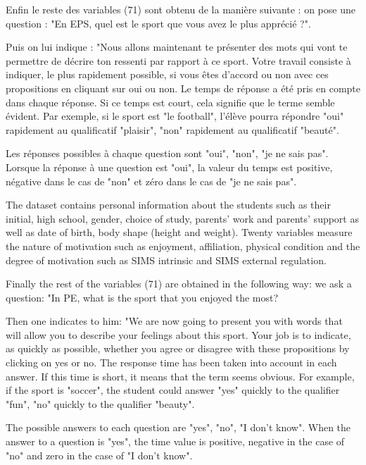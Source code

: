 \documentclass[12pt]{article}
\begin{document}
Enfin le reste des  variables (71)  sont obtenu de la manière suivante :
on pose une question : "En EPS, quel est le sport que vous avez le plus apprécié ?".

Puis on lui indique :
"Nous allons maintenant te présenter des mots qui vont te permettre de décrire ton ressenti par rapport à ce sport. Votre travail consiste à indiquer, le plus rapidement possible, si vous êtes d'accord ou non avec ces propositions en cliquant sur oui ou non.
Le temps de réponse a été pris en compte dans chaque réponse. Si ce temps est court, cela signifie que le terme semble évident.
Par exemple, si le sport est "le football", l'élève pourra répondre "oui" rapidement au qualificatif "plaisir", "non" rapidement au qualificatif "beauté".

Les réponses possibles à chaque question sont "oui", "non", "je ne sais pas". Lorsque la réponse à une question est "oui", la valeur du temps est positive, négative dans le cas de "non" et zéro dans le cas de "je ne sais pas".



The dataset contains personal information about the students such as their initial, high school, gender, choice of study, parents' work and parents' support as well as date of birth, body shape (height and weight). Twenty variables measure the nature of motivation such as enjoyment, affiliation, physical condition and the degree of motivation such as SIMS intrinsic and SIMS external regulation. 

Finally the rest of the variables (71) are obtained in the following way:
we ask a question: "In PE, what is the sport that you enjoyed the most?

Then one indicates to him:
"We are now going to present you with words that will allow you to describe your feelings about this sport. Your job is to indicate, as quickly as possible, whether you agree or disagree with these propositions by clicking on yes or no.
The response time has been taken into account in each answer. If this time is short, it means that the term seems obvious.
For example, if the sport is "soccer", the student could answer "yes" quickly to the qualifier "fun", "no" quickly to the qualifier "beauty".

The possible answers to each question are "yes", "no", "I don't know". When the answer to a question is "yes", the time value is positive, negative in the case of "no" and zero in the case of "I don't know".
\end{document}
